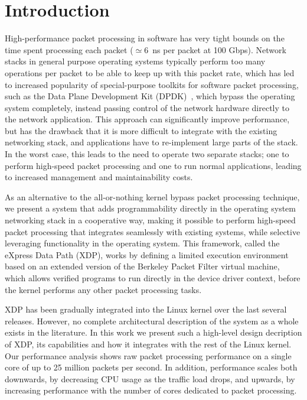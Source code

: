 \documentclass[10pt,sigconf]{acmart}
\begin{document}

\maketitle

\section{Introduction}%
\label{sec:introduction}
High-performance packet processing in software has very tight bounds on the time
spent processing each packet ($\simeq6$~ns per packet at 100 Gbps). Network
stacks in general purpose operating systems typically perform too many
operations per packet to be able to keep up with this packet rate, which has led
to increased popularity of special-purpose toolkits for software packet
processing, such as the Data Plane Development Kit (DPDK)~\cite{dpdk}, which
bypass the operating system completely, instead passing control of the network
hardware directly to the network application. This approach can significantly
improve performance, but has the drawback that it is more difficult to integrate
with the existing networking stack, and applications have to re-implement large
parts of the stack. In the worst case, this leads to the need to operate two
separate stacks; one to perform high-speed packet processing and one to run
normal applications, leading to increased management and maintainability costs.

As an alternative to the all-or-nothing kernel bypass packet processing
technique, we present a system that adds programmability directly in the
operating system networking stack in a cooperative way, making it possible to
perform high-speed packet processing that integrates seamlessly with existing
systems, while selective leveraging functionality in the operating system. This
framework, called the eXpress Data Path (XDP), works by defining a limited
execution environment based on an extended version of the Berkeley Packet Filter
virtual machine, which allows verified programs to run directly in the device
driver context, before the kernel performs any other packet processing tasks.

XDP has been gradually integrated into the Linux kernel over the last several
releases. However, no complete architectural description of the system as a
whole exists in the literature. In this work we present such a high-level design
decription of XDP, its capabilities and how it integrates with the rest of the
Linux kernel. Our performance analysis shows raw packet processing performance
on a single core of up to 25 million packets per second. In addition,
performance scales both downwards, by decreasing CPU usage as the traffic load
drops, and upwards, by increasing performance with the number of cores dedicated
to packet processing.
\end{document}
